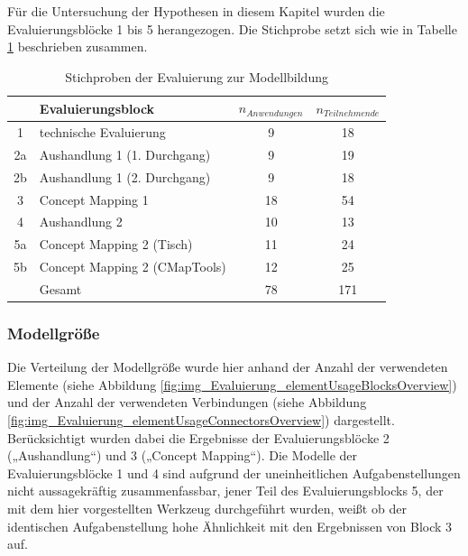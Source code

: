 Für die Untersuchung der Hypothesen in diesem Kapitel wurden die Evaluierungsblöcke 1 bis 5 herangezogen. Die Stichprobe setzt sich wie in Tabelle \ref{tab:stichprobe_modell} beschrieben zusammen.

\begin{table}[htbp]
	\centering
	\caption{Stichproben der Evaluierung zur Modellbildung}

	\begin{tabular}{| c | l || c | c |}
	\hline
		& Evaluierungsblock & $n_{Anwendungen}$ & $n_{Teilnehmende}$ \\ \hline
		1 & technische Evaluierung		  &  9 & 18 \\
		2a & Aushandlung 1 (1. Durchgang)  &  9 & 19 \\
		2b & Aushandlung 1 (2. Durchgang)  &  9 & 18 \\
		3 & Concept Mapping 1			  & 18 & 54 \\
		4 & Aushandlung 2				  & 10 & 13 \\
		5a & Concept Mapping 2 (Tisch)     & 11 & 24 \\
		5b & Concept Mapping 2 (CMapTools) & 12 & 25 \\ \hline
		& Gesamt						  & 78 & 171 \\ \hline
\end{tabular}
	\label{tab:stichprobe_modell}
\end{table}

\subsubsection{Modellgröße} %
\label{ssub:modellgröße}

Die Verteilung der Modellgröße wurde hier anhand der Anzahl der verwendeten Elemente (siehe Abbildung \ref{fig:img_Evaluierung_elementUsageBlocksOverview}) und der Anzahl der verwendeten Verbindungen (siehe Abbildung \ref{fig:img_Evaluierung_elementUsageConnectorsOverview}) dargestellt. Berücksichtigt wurden dabei die Ergebnisse der Evaluierungsblöcke 2 („Aushandlung“) und 3 („Concept Mapping“). Die Modelle der Evaluierungsblöcke 1 und 4 sind aufgrund der uneinheitlichen Aufgabenstellungen nicht aussagekräftig zusammenfassbar, jener Teil des Evaluierungsblocks 5, der mit dem hier vorgestellten Werkzeug durchgeführt wurden, weißt ob der identischen Aufgabenstellung hohe Ähnlichkeit mit den Ergebnissen von Block 3 auf.

